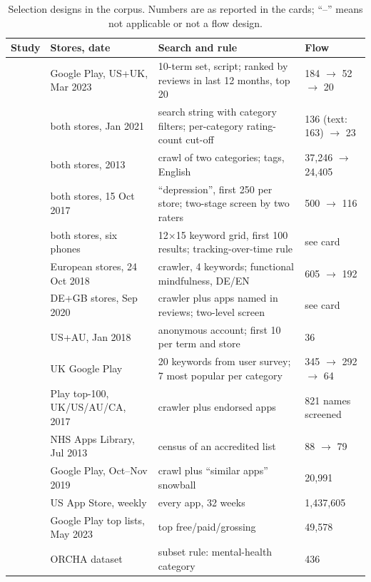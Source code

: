 \begin{table}[t]
\centering\small
\caption{Selection designs in the corpus. Numbers are as reported in the cards; ``--'' means not applicable or not a flow design.}
\label{tab:A-designs}
\begin{tabularx}{\textwidth}{@{}P{2.6cm}P{3.0cm}Y P{2.6cm}@{}}
\toprule
\textbf{Study} & \textbf{Stores, date} & \textbf{Search and rule} & \textbf{Flow}\\
\midrule
{} & Google Play, US+UK, Mar 2023 & 10-term set, script; ranked by reviews in last 12 months, top 20 & 184 $\to$ 52 $\to$ 20\\
 & both stores, Jan 2021 & search string with category filters; per-category rating-count cut-off & 136 (text: 163) $\to$ 23\\
 & both stores, 2013 & crawl of two categories; tags, English & 37{,}246 $\to$ 24{,}405\\
 & both stores, 15 Oct 2017 & ``depression'', first 250 per store; two-stage screen by two raters & 500 $\to$ 116\\
 & both stores, six phones & 12$\times$15 keyword grid, first 100 results; tracking-over-time rule & see card\\
 & European stores, 24 Oct 2018 & crawler, 4 keywords; functional mindfulness, DE/EN & 605 $\to$ 192\\
 & DE+GB stores, Sep 2020 & crawler plus apps named in reviews; two-level screen & see card\\
 & US+AU, Jan 2018 & anonymous account; first 10 per term and store & 36\\
 & UK Google Play & 20 keywords from user survey; 7 most popular per category & 345 $\to$ 292 $\to$ 64\\
 & Play top-100, UK/US/AU/CA, 2017 & crawler plus endorsed apps & 821 names screened\\
 & NHS Apps Library, Jul 2013 & census of an accredited list & 88 $\to$ 79\\
 & Google Play, Oct--Nov 2019 & crawl plus ``similar apps'' snowball & 20{,}991\\
 & US App Store, weekly & every app, 32 weeks & 1{,}437{,}605\\
 & Google Play top lists, May 2023 & top free/paid/grossing & 49{,}578\\
 & ORCHA dataset & subset rule: mental-health category & 436\\
\bottomrule
\end{tabularx}
\end{table}

